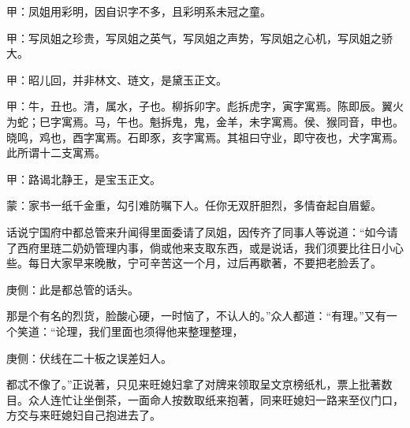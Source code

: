 
\begin{parag}
    \begin{note}甲：凤姐用彩明，因自识字不多，且彩明系未冠之童。\end{note}
\end{parag}


\begin{parag}
    \begin{note}甲：写凤姐之珍贵，写凤姐之英气，写凤姐之声势，写凤姐之心机，写凤姐之骄大。\end{note}
\end{parag}


\begin{parag}
    \begin{note}甲：昭儿回，并非林文、琏文，是黛玉正文。\end{note}
\end{parag}


\begin{parag}
    \begin{note}甲：牛，丑也。清，属水，子也。柳拆卯字。彪拆虎字，寅字寓焉。陈即辰。翼火为蛇；巳字寓焉。马，午也。魁拆鬼，鬼，金羊，未字寓焉。侯、猴同音，申也。晓鸣，鸡也，酉字寓焉。石即豕，亥字寓焉。其祖曰守业，即守夜也，犬字寓焉。此所谓十二支寓焉。\end{note}
\end{parag}


\begin{parag}
    \begin{note}甲：路谒北静王，是宝玉正文。\end{note}
\end{parag}


\begin{parag}
    \begin{note}蒙：家书一纸千金重，勾引难防嘱下人。任你无双肝胆烈，多情奋起自眉颦。\end{note}
\end{parag}


\begin{parag}
    话说宁国府中都总管来升闻得里面委请了凤姐，因传齐了同事人等说道：“如今请了西府里琏二奶奶管理内事，倘或他来支取东西，或是说话，我们须要比往日小心些。每日大家早来晚散，宁可辛苦这一个月，过后再歇著，不要把老脸丢了。\begin{note}庚侧：此是都总管的话头。\end{note}那是个有名的烈货，脸酸心硬，一时恼了，不认人的。”众人都道：“有理。”又有一个笑道：“论理，我们里面也须得他来整理整理，\begin{note}庚侧：伏线在二十板之误差妇人。\end{note}都忒不像了。”正说著，只见来旺媳妇拿了对牌来领取呈文京榜纸札，票上批著数目。众人连忙让坐倒茶，一面命人按数取纸来抱著，同来旺媳妇一路来至仪门口，方交与来旺媳妇自己抱进去了。
\end{parag}


